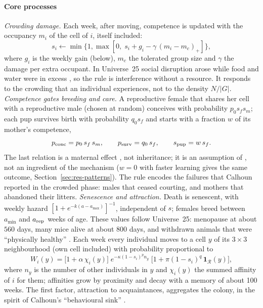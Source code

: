\paragraph{Core processes}
\emph{Crowding damage.} Each week, after moving, competence is updated with the occupancy $m_i$ of the cell of $i$,
itself included:
\begin{equation}\label{eq:stress}
  s_i\leftarrow\min\{1,\max[0,\;s_i+g_i-\gamma\,(m_i-m_c)_+]\},
\end{equation}
where $g_i$ is the weekly gain (below), $m_c$ the tolerated group size and $\gamma$ the damage per extra occupant. In
Universe~25 social disruption arose while food and water were in excess \citep{Calhoun1973}, so the rule is
interference without a resource. It responds to the crowding that an individual experiences, not to the density
$N/|G|$.
\emph{Competence gates breeding and care.} A reproductive female that shares her cell with a reproductive male
(chosen at random) conceives with probability $p_0s_fs_m$; each pup survives birth with probability $q_0s_f$ and
starts with a fraction $w$ of its mother's competence,
\begin{equation}\label{eq:breed}
  p_{\rm conc}=p_0\,s_f\,s_m,\qquad p_{\rm surv}=q_0\,s_f,\qquad s_{\rm pup}=w\,s_f.
\end{equation}
The last relation is a maternal effect \citep{GinzburgTaneyhill1994}, not inheritance; it is an
assumption of \Cone, not an ingredient of the mechanism ($w=0$ with faster learning gives the same outcome,
Section~\ref{sec:res-patterns}). The rule encodes the failures that Calhoun reported in the crowded phase: males that
ceased courting, and mothers that abandoned their litters.
\emph{Senescence and attraction.} Death is senescent, with weekly hazard $[1+e^{-k(a-a_{\max})}]^{-1}$, independent
of $s$; females breed between $a_{\min}$ and $a_{\rm rep}$ weeks of age. These values follow Universe~25: menopause at
about $560$ days, many mice alive at about $800$ days, and withdrawn animals that were ``physically healthy''
\citep{Calhoun1973}. Each week every individual moves to a cell $y$ of its $3\times3$ neighbourhood (own cell
included) with probability proportional to
\begin{equation}\label{eq:move}
  W_i(y)=\bigl[1+\alpha\,\chi_i(y)\bigr]\;e^{-\kappa(1-s_i)^{p}n_y}\;\bigl[1+\pi(1-s_i)^{q}\,\mathbf 1_{\mathcal R}(y)\bigr],
\end{equation}
where $n_y$ is the number of other individuals in $y$ and $\chi_i(y)$ the summed affinity of $i$ for them; affinities
grow by proximity and decay with a memory of about 100 weeks. The first factor, attraction to acquaintances,
aggregates the colony, in the spirit of Calhoun's ``behavioural sink'' \citep{Calhoun1962}.


